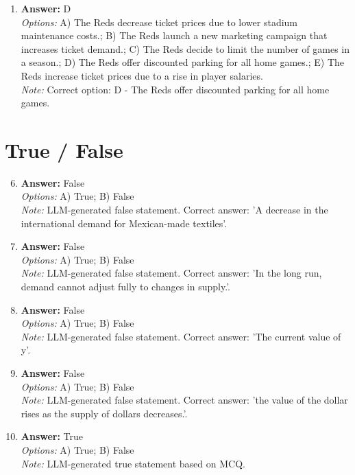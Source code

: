 \documentclass[12pt]{article}
\begin{document}
\begin{enumerate}[label=\arabic*.]
\\ \textit{Options:} A) can be used by banks to make loans or buy investments.; B) must be held at the FED exclusively.; C) must be kept in a bank's vault.; D) are optional for large banks but compulsory for smaller ones.; E) can be invested in government securities.
\\ \textit{Note:} Correct option: A - can be used by banks to make loans or buy investments.
\item \textbf{Answer:} D
\\ \textit{Options:} A) The Reds decrease ticket prices due to lower stadium maintenance costs.; B) The Reds launch a new marketing campaign that increases ticket demand.; C) The Reds decide to limit the number of games in a season.; D) The Reds offer discounted parking for all home games.; E) The Reds increase ticket prices due to a rise in player salaries.
\\ \textit{Note:} Correct option: D - The Reds offer discounted parking for all home games.
\end{enumerate}

\section*{True / False}
\begin{enumerate}[label=\arabic*.]
\setcounter{enumi}{5}
\item \textbf{Answer:} False
\\ \textit{Options:} A) True; B) False
\\ \textit{Note:} LLM-generated false statement. Correct answer: 'A decrease in the international demand for Mexican-made textiles'.
\item \textbf{Answer:} False
\\ \textit{Options:} A) True; B) False
\\ \textit{Note:} LLM-generated false statement. Correct answer: 'In the long run, demand cannot adjust fully to changes in supply.'.
\item \textbf{Answer:} False
\\ \textit{Options:} A) True; B) False
\\ \textit{Note:} LLM-generated false statement. Correct answer: 'The current value of y'.
\item \textbf{Answer:} False
\\ \textit{Options:} A) True; B) False
\\ \textit{Note:} LLM-generated false statement. Correct answer: 'the value of the dollar rises as the supply of dollars decreases.'.
\item \textbf{Answer:} True
\\ \textit{Options:} A) True; B) False
\\ \textit{Note:} LLM-generated true statement based on MCQ.
\end{enumerate}
\end{document}
